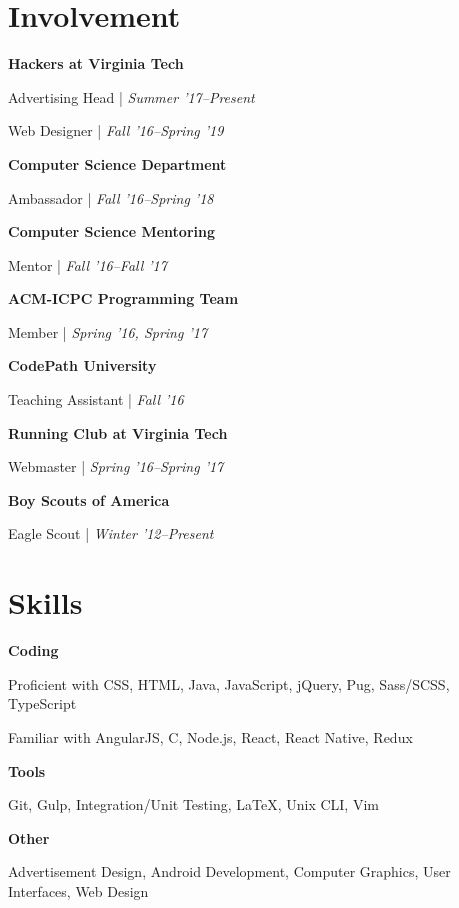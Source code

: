 \documentclass[9pt]{extarticle}
\newcommand{\Subsection}[2]{
    {\normalsize\bfseries\color{subsection}#1}
    \begin{trivlist}
        \color{bullet}#2
    \end{trivlist}
}
\newcommand{\ChronoItem}[2]{
    \item {\color{bullet}#1 | {\footnotesize\textit{#2}}}
}
\begin{document}
\begin{paracol}{2}
\begin{rightcolumn}
        \section{Involvement}
            \Subsection{Hackers at Virginia Tech}{
                \ChronoItem{Advertising Head}{Summer '17--Present}
                \ChronoItem{Web Designer}{Fall '16--Spring '19}
            }
            \vfill
            \Subsection{Computer Science Department}{
                \ChronoItem{Ambassador}{Fall '16--Spring '18}
            }
            \vfill
            \Subsection{Computer Science Mentoring}{
                \ChronoItem{Mentor}{Fall '16--Fall '17}
            }
            \vfill
            \Subsection{ACM-ICPC Programming Team}{
                \ChronoItem{Member}{Spring '16, Spring '17}
            }
            \vfill
            \Subsection{CodePath University}{
                \ChronoItem{Teaching Assistant}{Fall '16}
            }
            \vfill
            \Subsection{Running Club at Virginia Tech}{
                \ChronoItem{Webmaster}{Spring '16--Spring '17}
            }
            \vfill
            \Subsection{Boy Scouts of America}{
                \ChronoItem{Eagle Scout}{Winter '12--Present}
            }
        \vfill
        \section{Skills}
            \Subsection{Coding}{
                \item Proficient with CSS, HTML, Java, JavaScript, jQuery, Pug, Sass/SCSS, TypeScript
                \item Familiar with AngularJS, C, Node.js, React, React Native, Redux
            }
            \vfill
            \Subsection{Tools}{
                \item Git, Gulp, Integration/Unit Testing, LaTeX, Unix CLI, Vim
            }
            \vfill
            \Subsection{Other}{
                \item Advertisement Design, Android Development, Computer Graphics, User Interfaces, Web Design
            }
        \pagebreak
    \end{rightcolumn}
\end{paracol}
\end{document}
